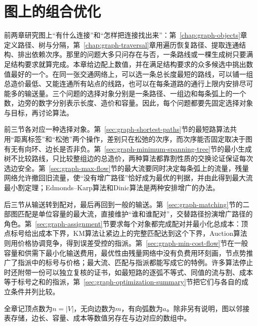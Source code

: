 \chapter{图上的组合优化}
\label{chap:graph-optimization}

前两章研究图上“有什么连接”和“怎样把连接找出来”：第~\ref{chap:graph-objects}章定义路径、树与分隔，第~\ref{chap:graph-traversal}章用遍历恢复路径、提取连通结构、排出依赖次序。那里的问题大多只问存在与否，一条路线或一棵生成树只要满足结构要求就算完成。本章给边配上数值，并在满足结构要求的众多候选中挑出数值最好的一个。在同一张交通网络上，可以选一条总长度最短的路线，可以铺一组总造价最低、又能连通所有站点的线路，也可以在每条道路的通行上限内安排尽可能多的输送量。三个问题的选择对象分别是一条路径、一组边和每条弧上的一个数，边旁的数字分别表示长度、造价和容量。因此，每个问题都要先固定选择对象与目标，再讨论算法。

前三节各对应一种选择对象。第~\ref{sec:graph-shortest-paths}节的最短路算法共用“距离标签”和“松弛”两个操作，差别只在松弛的次序，而次序能否固定取决于图有无有向环、边长是否非负。第~\ref{sec:graph-minimum-spanning-tree}节的最小生成树不比较路线，只比较整组边的总造价，两种算法都靠割性质的交换论证保证每次选边安全。第~\ref{sec:graph-max-flow}节的最大流要同时决定每条弧上的流量，残量网络允许撤回旧流量，使“没有增广路径”恰好成为最优的判据，并由此得到最大流最小割定理；Edmonds--Karp算法和Dinic算法是两种安排增广的办法。

后三节从输送转到配对，最后再回到一般的输送。第~\ref{sec:graph-matching}节的二部图匹配是单位容量的最大流，直接维护“谁和谁配对”，交替路径扮演增广路径的角色。第~\ref{sec:graph-assignment}节要求每个对象都完成配对并最小化总成本：顶点标号给出成本下界，KM算法让紧边上的完整匹配达到这个下界，Auction算法则用价格协调竞争，得到误差受控的指派。第~\ref{sec:graph-min-cost-flow}节在一般容量和供需下最小化输送费用，最优性由残量网络中没有负费用环刻画，节点势推广了指派中的标号与价格；最大流、匹配与指派都能写成它的特例。许多算法停止时还附带一份可以独立复核的证书，如最短路的逐弧不等式、同值的流与割、成本等于标号之和的指派，第~\ref{sec:graph-optimization-summary}节把它们与各自的成立条件并列比较。

全章记顶点数为$n=|V|$，无向边数为$m$，有向弧数为$a$。除非另有说明，图以邻接表存储，边长、容量、成本等数值另存在与边对应的数组中。









